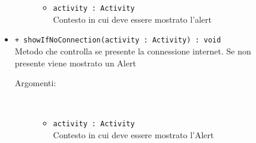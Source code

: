 \documentclass[../DefinizioneDiProdotto.tex]{subfiles}
\begin{document}
\begin{description}
\begin{itemize}
\begin{description}
\begin{itemize}
				\item \texttt{activity : Activity}\\
				Contesto in cui deve essere mostrato l'alert\end{itemize}
		\end{description}
		\item \texttt{+ showIfNoConnection(activity : Activity) : void}\\
		Metodo che controlla se presente la connessione internet. Se non presente viene mostrato un Alert
		\begin{description}
			\item[Argomenti:] \
			\begin{itemize}
				\item \texttt{activity : Activity}\\
				Contesto in cui deve essere mostrato l'Alert\end{itemize}
		\end{description}
	\end{itemize}
\end{description}
\end{document}

